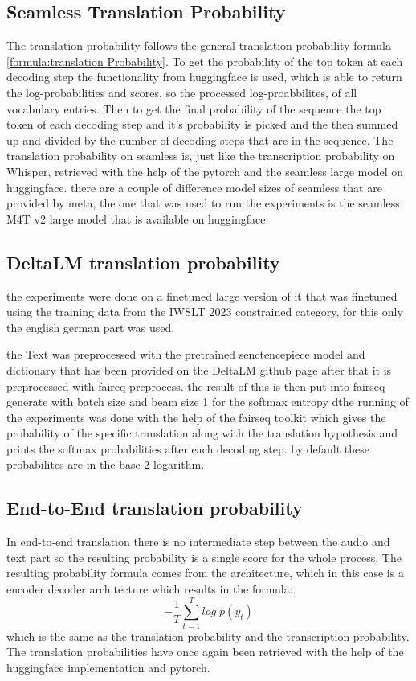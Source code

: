 \subsection{Seamless Translation Probability}
The translation probability follows the general translation probability formula \autoref{formula:translation Probability}. To get the probability of the top token at each decoding step the functionality from huggingface is used, which is able to return the log-probabilities and scores, so the processed log-proabbilites, of all vocabulary entries. 
Then to get the final probability of the sequence the top token of each decoding step and it's probability is picked and the then summed up and divided by the number of decoding steps that are in the sequence.
The translation probability on seamless is, just like the transcription probability on Whisper, retrieved with the help of the pytorch and the seamless large model on huggingface. 
there are a couple of difference model sizes of seamless that are provided by meta, the one that was used to run the experiments is the seamless M4T v2 large model that is available on huggingface. 

\subsection{DeltaLM translation probability}
the experiments \cite{ma2021deltalm} were done on a finetuned large version of it that was finetuned using the training data from the IWSLT 2023 constrained category, for this only the english german part was used.

the Text was preprocessed with the pretrained senctencepiece model and dictionary that has been provided on the DeltaLM github page \cite{deltalmurl} after that it is preprocessed with faireq preprocess. the result of this is then put into fairseq generate with batch size and beam size 1 for the softmax entropy 
 dthe running of the experiments was done with the help of the fairseq toolkit \cite{ott2019fairseqfastextensibletoolkit} which gives the probability of the specific translation along with the translation hypothesis and prints the softmax probabilities after each decoding step. by default these probabilites are in the base 2 logarithm. 

\subsection{End-to-End translation probability}
In end-to-end translation there is no intermediate step between the audio and text part so the resulting probability is a single score for the whole process.
The resulting probability formula comes from the architecture, which in this case is a encoder decoder architecture which results in the formula: $$-\frac{1}{T}\sum_{t=1}^T log\; p(y_t)$$ which is the same as the translation probability and the transcription probability.
The translation probabilities have once again been retrieved with the help of the huggingface implementation and pytorch. 

